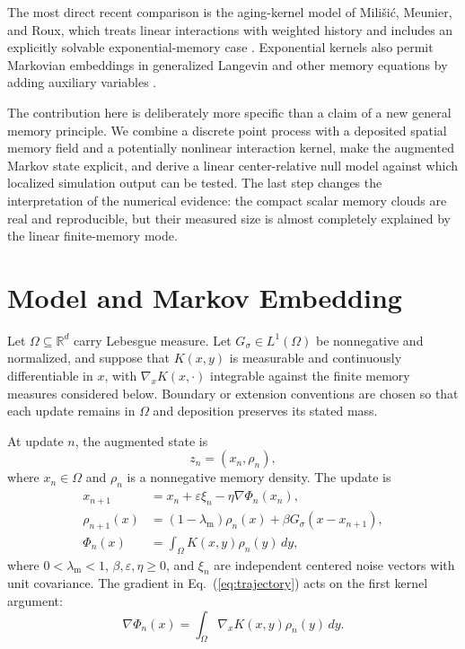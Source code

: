 \documentclass[reprint,amsmath,amssymb,aps,prd,nofootinbib,floatfix]{revtex4-2}
\begin{document}
The most direct recent comparison is the aging-kernel model of Mili\v{s}i\'c,
Meunier, and Roux, which treats linear interactions with weighted history and
includes an explicitly solvable exponential-memory case
\cite{MilisicMeunierRoux2026}.
Exponential kernels also permit Markovian embeddings in generalized Langevin
and other memory equations by adding auxiliary variables
\cite{Mori1965,Zwanzig2001,JaganathanValani2025}.

The contribution here is deliberately more specific than a claim of a new
general memory principle.
We combine a discrete point process with a deposited spatial memory field and
a potentially nonlinear interaction kernel, make the augmented Markov state
explicit, and derive a linear center-relative null model against which
localized simulation output can be tested.
The last step changes the interpretation of the numerical evidence: the
compact scalar memory clouds are real and reproducible, but their measured
size is almost completely explained by the linear finite-memory mode.

\section{Model and Markov Embedding}

Let $\Omega\subseteq\mathbb{R}^d$ carry Lebesgue measure.
Let $G_\sigma\in L^1(\Omega)$ be nonnegative and normalized, and suppose that
$K(x,y)$ is measurable and continuously differentiable in $x$, with
$\nabla_xK(x,\cdot)$ integrable against the finite memory measures considered
below.
Boundary or extension conventions are chosen so that each update remains in
$\Omega$ and deposition preserves its stated mass.

At update $n$, the augmented state is
\begin{equation}
z_n=(x_n,\rho_n),
\end{equation}
where $x_n\in\Omega$ and $\rho_n$ is a nonnegative memory density.
The update is
\begin{align}
x_{n+1}
&=x_n+\varepsilon\xi_n-\eta\nabla\Phi_n(x_n),
\label{eq:trajectory}\\
\rho_{n+1}(x)
&=(1-\lambda_{\mathrm m})\rho_n(x)
+ \beta G_\sigma(x-x_{n+1}),
\label{eq:memory}\\
\Phi_n(x)
&=\int_\Omega K(x,y)\rho_n(y)\,dy ,
\label{eq:potential}
\end{align}
where $0<\lambda_{\mathrm m}<1$, $\beta,\varepsilon,\eta\geq0$, and
$\xi_n$ are independent centered noise vectors with unit covariance.
The gradient in Eq.~(\ref{eq:trajectory}) acts on the first kernel argument:
\begin{equation}
\nabla\Phi_n(x)
=\int_\Omega\nabla_xK(x,y)\rho_n(y)\,dy .
\end{equation}
\end{document}
